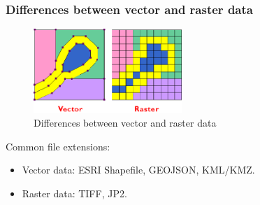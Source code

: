 \documentclass[8.5pt]{beamer}
\begin{document}
\begin{frame}
\frametitle{Differences between vector and raster data}


\begin{figure}
    \centering
    \includegraphics[width=0.5\textwidth]{images/vector_raster.png}
    \caption{Differences between vector and raster data}
    \label{fig:differences_vector_raster}
\end{figure}

Common file extensions:

\begin{itemize}
    \item Vector data: ESRI Shapefile, GEOJSON, KML/KMZ.
    \item Raster data: TIFF, JP2.
\end{itemize}

\end{frame}
\end{document}
